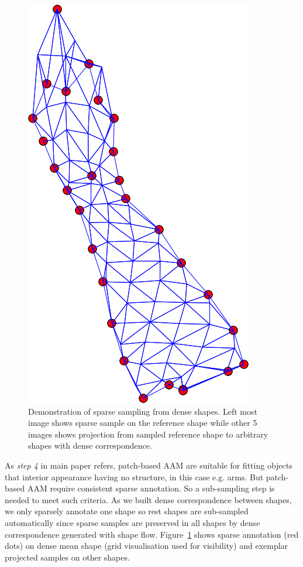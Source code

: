 \begin{figure}[!b]
    \includegraphics[height=\ofh]{Suplementory_Meterial/SparseSamples/mean-4.png}
\caption{Demonstration of sparse sampling from dense shapes. Left most image shows sparse sample on the reference shape while other 5 images shows projection from sampled reference shape to arbitrary shapes with dense correspondence.}
\label{fig:sparsesample}
\end{figure}

As \emph{step 4} in main paper refers, patch-based AAM are suitable for fitting objects that interior appearance having no structure, in this case e.g. arms. But patch-based AAM require consistent sparse annotation. So a sub-sampling step is needed to meet such criteria. As we built dense correspondence between shapes, we only sparsely annotate one shape so rest shapes are sub-sampled automatically since sparse samples are preserved in all shapes by dense correspondence generated with shape flow. Figure~\ref{fig:sparsesample} shows sparse annotation (red dots) on dense mean shape (grid visualisation used for visibility) and exemplar projected samples on other shapes.

